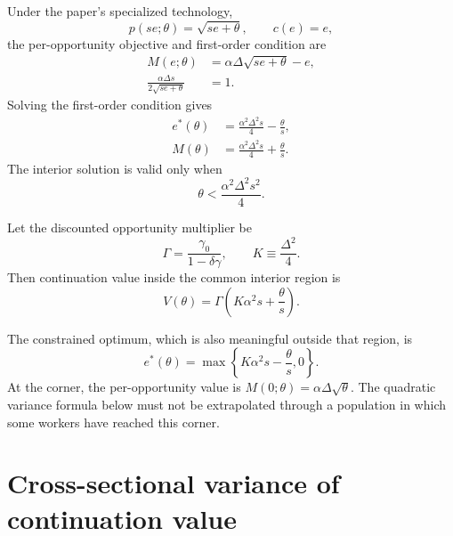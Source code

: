 \documentclass[11pt]{article}
\begin{document}
Under the paper's specialized technology,
\begin{equation}
  p(se;\theta)=\sqrt{se+\theta},
  \qquad c(e)=e,
\end{equation}
the per-opportunity objective and first-order condition are
\begin{align}
  M(e;\theta)&=\alpha\Delta\sqrt{se+\theta}-e,\\
  \frac{\alpha\Delta s}{2\sqrt{se+\theta}}&=1.
\end{align}
Solving the first-order condition gives
\begin{align}
  e^*(\theta)&=\frac{\alpha^2\Delta^2s}{4}-\frac{\theta}{s},\\
  M(\theta)&=\frac{\alpha^2\Delta^2s}{4}+\frac{\theta}{s}.
\end{align}
The interior solution is valid only when
\begin{equation}
  \theta<\frac{\alpha^2\Delta^2s^2}{4}.
  \label{eq:interior}
\end{equation}

Let the discounted opportunity multiplier be
\begin{equation}
  \Gamma=\frac{\gamma_0}{1-\delta\gamma},
  \qquad K\equiv\frac{\Delta^2}{4}.
\end{equation}
Then continuation value inside the common interior region is
\begin{equation}
  V(\theta)=\Gamma\left(K\alpha^2s+\frac{\theta}{s}\right).
  \label{eq:value}
\end{equation}

The constrained optimum, which is also meaningful outside that region, is
\begin{equation}
  e^*(\theta)=\max\left\{K\alpha^2s-\frac{\theta}{s},0\right\}.
\end{equation}
At the corner, the per-opportunity value is
$M(0;\theta)=\alpha\Delta\sqrt{\theta}$. The quadratic variance formula below
must not be extrapolated through a population in which some workers have
reached this corner.

\section{Cross-sectional variance of continuation value}
\end{document}
